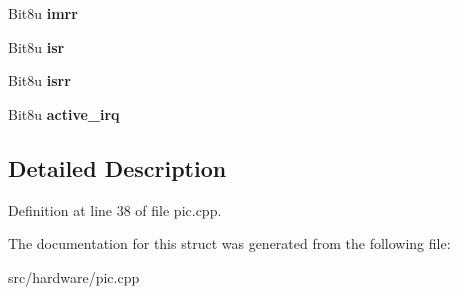 \begin{DoxyCompactItemize}
\item 
\hypertarget{structPIC__Controller_a138308d81e33e95b85c37931a67427d0}{Bit8u {\bfseries imrr}}\label{structPIC__Controller_a138308d81e33e95b85c37931a67427d0}

\item 
\hypertarget{structPIC__Controller_a659d63dbd7cba92eed18a49421d94bec}{Bit8u {\bfseries isr}}\label{structPIC__Controller_a659d63dbd7cba92eed18a49421d94bec}

\item 
\hypertarget{structPIC__Controller_ae3d8234bf6bc4cb37b27e961fee92f72}{Bit8u {\bfseries isrr}}\label{structPIC__Controller_ae3d8234bf6bc4cb37b27e961fee92f72}

\item 
\hypertarget{structPIC__Controller_abbe151d9c4816820e6e8e2fb3f5c2b8f}{Bit8u {\bfseries active\-\_\-irq}}\label{structPIC__Controller_abbe151d9c4816820e6e8e2fb3f5c2b8f}

\end{DoxyCompactItemize}


\subsection{Detailed Description}


Definition at line 38 of file pic.\-cpp.



The documentation for this struct was generated from the following file\-:\begin{DoxyCompactItemize}
\item 
src/hardware/pic.\-cpp\end{DoxyCompactItemize}
